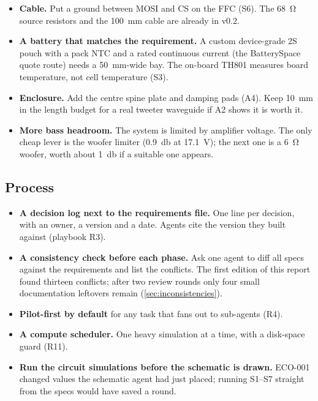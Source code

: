 \begin{itemize}
  \item \textbf{Cable.} Put a ground between MOSI and CS on the FFC (S6). The \qty{68}{\ohm} source resistors and the \qty{100}{\milli\metre} cable are already in v0.2.
  \item \textbf{A battery that matches the requirement.} A custom device-grade 2S pouch with a pack NTC and a rated continuous current (the BatterySpace quote route) needs a \qty{50}{\milli\metre}-wide bay. The on-board TH801 measures board temperature, not cell temperature (S3).
  \item \textbf{Enclosure.} Add the centre spine plate and damping pads (A4). Keep \qty{10}{\milli\metre} in the length budget for a real tweeter waveguide if A2 shows it is worth it.
  \item \textbf{More bass headroom.} The system is limited by amplifier voltage. The only cheap lever is the woofer limiter (\qty{+0.9}{\decibel} at \qty{17.1}{\volt}); the next one is a \qty{6}{\ohm} woofer, worth about \qty{1}{\decibel} if a suitable one appears.
\end{itemize}

\subsection{Process}
\begin{itemize}
  \item \textbf{A decision log next to the requirements file.} One line per decision, with an owner, a version and a date. Agents cite the version they built against (playbook R3).
  \item \textbf{A consistency check before each phase.} Ask one agent to diff all specs against the requirements and list the conflicts. The first edition of this report found thirteen conflicts; after two review rounds only four small documentation leftovers remain (\cref{sec:inconsistencies}).
  \item \textbf{Pilot-first by default} for any task that fans out to sub-agents (R4).
  \item \textbf{A compute scheduler.} One heavy simulation at a time, with a disk-space guard (R11).
  \item \textbf{Run the circuit simulations before the schematic is drawn.} ECO-001 changed values the schematic agent had just placed; running S1--S7 straight from the specs would have saved a round.
\end{itemize}
